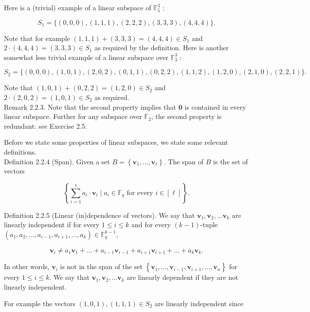 \documentclass[10pt]{article}
\begin{document}
Here is a (trivial) example of a linear subspace of $\mathbb{F}_{5}^{3}$ :


\begin{equation*}
S_{1}=\{(0,0,0),(1,1,1),(2,2,2),(3,3,3),(4,4,4)\} . \tag{2.1}
\end{equation*}


Note that for example $(1,1,1)+(3,3,3)=(4,4,4) \in S_{1}$ and $2 \cdot(4,4,4)=(3,3,3) \in S_{1}$ as required by the definition. Here is another somewhat less trivial example of a linear subspace over $\mathbb{F}_{3}^{3}$ :


\begin{equation*}
S_{2}=\{(0,0,0),(1,0,1),(2,0,2),(0,1,1),(0,2,2),(1,1,2),(1,2,0),(2,1,0),(2,2,1)\} . \tag{2.2}
\end{equation*}


Note that $(1,0,1)+(0,2,2)=(1,2,0) \in S_{2}$ and $2 \cdot(2,0,2)=(1,0,1) \in S_{2}$ as required.\\
Remark 2.2.3. Note that the second property implies that $\mathbf{0}$ is contained in every linear subspace. Further for any subspace over $\mathbb{F}_{2}$, the second property is redundant: see Exercise 2.5.

Before we state some properties of linear subspaces, we state some relevant definitions.\\
Definition 2.2.4 (Span). Given a set $B=\left\{\mathbf{v}_{1}, \ldots, \mathbf{v}_{\ell}\right\}$. The span of $B$ is the set of vectors

$$
\left\{\sum_{i=1}^{\ell} a_{i} \cdot \mathbf{v}_{i} \mid a_{i} \in \mathbb{F}_{q} \text { for every } i \in[\ell]\right\} .
$$

Definition 2.2.5 (Linear (in)dependence of vectors). We say that $\mathbf{v}_{1}, \mathbf{v}_{2}, \ldots \mathbf{v}_{k}$ are linearly independent if for every $1 \leq i \leq k$ and for every $(k-1)$-tuple $\left(a_{1}, a_{2}, \ldots, a_{i-1}, a_{i+1}, \ldots, a_{k}\right) \in \mathbb{F}_{q}^{k-1}$,

$$
\mathbf{v}_{i} \neq a_{1} \mathbf{v}_{1}+\ldots+a_{i-1} \mathbf{v}_{i-1}+a_{i+1} \mathbf{v}_{i+1}+\ldots+a_{k} \mathbf{v}_{k} .
$$

In other words, $\mathbf{v}_{i}$ is not in the span of the set $\left\{\mathbf{v}_{1}, \ldots, \mathbf{v}_{i-1}, \mathbf{v}_{i+1}, \ldots, \mathbf{v}_{n}\right\}$ for every $1 \leq i \leq k$. We say that $\mathbf{v}_{1}, \mathbf{v}_{2}, \ldots \mathbf{v}_{k}$ are linearly dependent if they are not linearly independent.

For example the vectors $(1,0,1),(1,1,1) \in S_{2}$ are linearly independent since
\end{document}
